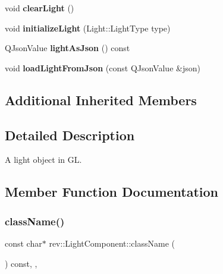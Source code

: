 \begin{DoxyCompactItemize}
\mbox{\label{classrev_1_1_light_component_ad838fa5a1e2c90c054fb0a55924a1a56}} 
void {\bfseries clear\+Light} ()
\item 
\mbox{\label{classrev_1_1_light_component_a98b85f8fa2c33641c5f0ec500d683631}} 
void {\bfseries initialize\+Light} (Light\+::\+Light\+Type type)
\item 
\mbox{\label{classrev_1_1_light_component_afbdd47d0335759d2c365d6b77de7e911}} 
Q\+Json\+Value {\bfseries light\+As\+Json} () const
\item 
\mbox{\label{classrev_1_1_light_component_afa2fae7c54a03386f0b0adffdbba049e}} 
void {\bfseries load\+Light\+From\+Json} (const Q\+Json\+Value \&json)
\end{DoxyCompactItemize}
\subsection*{Additional Inherited Members}


\subsection{Detailed Description}
A light object in GL. 

\subsection{Member Function Documentation}
\mbox{\label{classrev_1_1_light_component_a627371d0bebc32f2eb91e6e5b95f81d0}} 
\subsubsection{\texorpdfstring{className()}{className()}}
{\footnotesize\ttfamily const char$\ast$ rev\+::\+Light\+Component\+::class\+Name (\begin{DoxyParamCaption}{ }\end{DoxyParamCaption}) const\hspace{0.3cm}{\ttfamily [inline]}, {\ttfamily [override]}, {\ttfamily [virtual]}}



